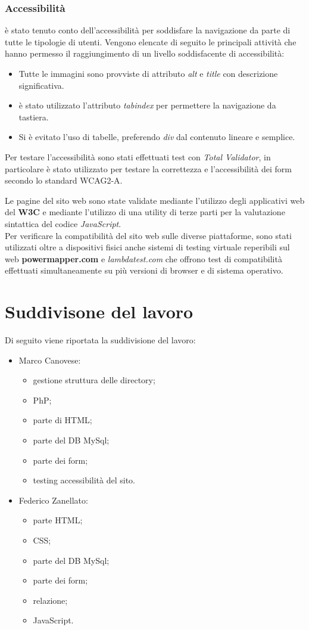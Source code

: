 \subsubsection{Accessibilità}
è stato tenuto conto dell'accessibilità per soddisfare la navigazione da parte di tutte le tipologie di utenti. Vengono elencate di seguito le principali attività che hanno permesso il raggiungimento di un livello soddisfacente di accessibilità:
\begin{itemize}
	\item Tutte le immagini sono provviste di attributo \textit{alt} e \textit{title} con descrizione significativa.
	\item è stato utilizzato l'attributo \textit{tabindex} per permettere la navigazione da tastiera.
	\item Si è evitato l'uso di tabelle, preferendo \textit{div}  dal contenuto lineare e semplice.

\end{itemize}
Per testare l'accessibilità sono stati effettuati test con \textit{Total Validator}, in particolare è stato utilizzato per testare la correttezza e l'accessibilità dei form secondo lo standard WCAG2-A.

Le pagine del sito web sono state validate mediante l’utilizzo degli applicativi web del \textbf{W3C} e mediante l’utilizzo di una utility di terze parti per la valutazione sintattica del codice \textit{JavaScript}.\\
Per verificare la compatibilità del sito web sulle diverse piattaforme, sono stati utilizzati oltre a dispositivi fisici anche sistemi di testing virtuale reperibili sul web \textbf{powermapper.com} e \textit{lambdatest.com} che offrono test di compatibilità effettuati simultaneamente su più versioni di browser e di sistema operativo.



\section{Suddivisone del lavoro}
Di seguito viene riportata la suddivisione del lavoro:
\begin{itemize}
	\item Marco Canovese:
	\begin{itemize}
		\item gestione struttura delle directory;
		\item PhP;
		\item parte di HTML;
		\item parte del DB MySql;
		\item parte dei form;
		\item testing accessibilità del sito.
	\end{itemize}
\end{itemize}

\begin{itemize}
	\item Federico Zanellato:
	\begin{itemize}
		\item parte HTML;
		\item CSS;
		\item parte del DB MySql;
		\item parte dei form;
		\item relazione;
		\item JavaScript.
	\end{itemize}
\end{itemize}


